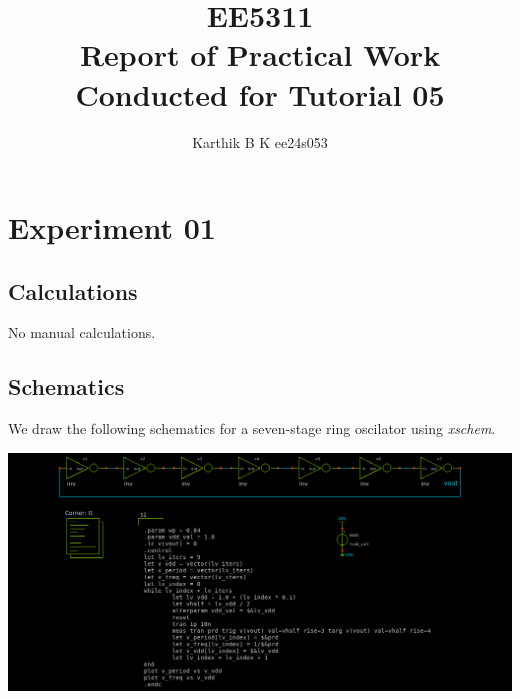 \documentclass[12pt,a4paper]{article}
\begin{document}
\title{EE5311 \\ Report of Practical Work Conducted for Tutorial 05}
\author{Karthik B K ee24s053}
\maketitle

\section{Experiment 01}
\subsection{Calculations}
\noindent No manual calculations.

\subsection{Schematics}
\noindent We draw the following schematics for a seven-stage ring oscilator using \emph{xschem}.
\begin{center}
\includegraphics[width=0.99\linewidth]{tut4/expt1/ro7.sch.png}
\end{center}
\end{document}
